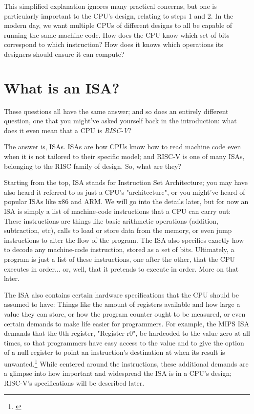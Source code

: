 \documentclass[12pt,twoside]{reedthesis}
\begin{document}
This simplified explanation ignores many practical concerns, but one is particularly important to the CPU's design, relating to steps 1 and 2. In the modern day, we want multiple CPUs of different designs to all be capable of running the same machine code. How does the CPU know which set of bits correspond to which instruction? How does it knows which operations its designers should ensure it can compute?

\section{What is an ISA?}

These questions all have the same answer; and so does an entirely different question, one that you might've asked yourself back in the introduction: what does it even mean that a CPU is \textit{RISC-V}?

The answer is, ISAs. ISAs are how CPUs know how to read machine code even when it is not tailored to their specific model; and RISC-V is one of many ISAs, belonging to the RISC family of design. So, what are they?

Starting from the top, ISA stands for Instruction Set Architecture; you may have also heard it referred to as just a CPU's "architecture", or you might've heard of popular ISAs like x86 and ARM.
We will go into the details later, but for now an ISA is simply a list of machine-code instructions that a CPU can carry out: These instructions are things like basic arithmetic operations (addition, subtraction, etc), calls to load or store data from the memory, or even jump instructions to alter the flow of the program. The ISA also specifies exactly how to decode any machine-code instruction, stored as a set of bits. Ultimately, a program is just a list of these instructions, one after the other, that the CPU executes in order... or, well, that it pretends to execute in order. More on that later.

The ISA also contains certain hardware specifications that the CPU should be assumed to have: Things like the amount of registers available and how large a value they can store, or how the program counter ought to be measured, or even certain demands to make life easier for programmers. For example, the MIPS ISA demands that the 0th register, "Register r0", be hardcoded to the value zero at all times, so that programmers have easy access to the value and to give the option of a null register to point an instruction's destination at when its result is unwanted.\footnote{\cite{waterman}} While centered around the instructions, these additional demands are a glimpse into how important and widespread the ISA is in a CPU's design; RISC-V's specifications will be described later.
\end{document}
